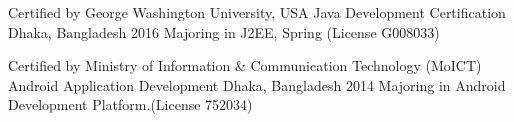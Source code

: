 
\begin{cventries}
	
	\cventry
	{Certified by George Washington University, USA} %
	{Java Development Certification} %
	{Dhaka, Bangladesh} %
	{2016} %
	{Majoring in J2EE, Spring (License G008033)}
	
	\cventry
	{Certified by Ministry of Information \& Communication Technology (MoICT)} %
	{Android Application Development} %
	{Dhaka, Bangladesh} %
	{2014} %
	{Majoring in Android Development Platform.(License 752034) }
	
	
\end{cventries}